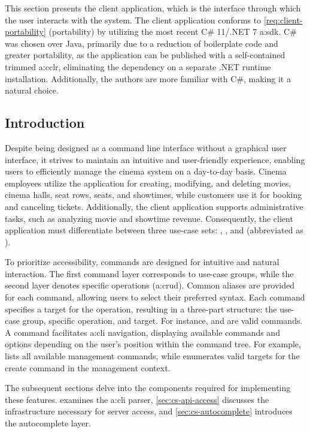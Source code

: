 This section presents the client application, which is the interface through which the user interacts with the system. The client application conforms to \cref{req:client-portability} (portability) by utilizing the most recent C\# 11/.NET 7 \gls{a:sdk}. C\# was chosen over Java, primarily due to a reduction of boilerplate code and greater portability, as the application can be published with a self-contained trimmed \gls{a:cclr}, eliminating the dependency on a separate .NET runtime installation. Additionally, the authors are more familiar with C\#, making it a natural choice.

\subsection{Introduction}

Despite being designed as a command line interface without a graphical user interface, it strives to maintain an intuitive and user-friendly experience, enabling users to efficiently manage the cinema system on a day-to-day basis. Cinema employees utilize the application for creating, modifying, and deleting movies, cinema halls, seat rows, seats, and showtimes, while customers use it for booking and canceling tickets. Additionally, the client application supports administrative tasks, such as analyzing movie and showtime revenue. Consequently, the client application must differentiate between three use-case sets: , , and  (abbreviated as ).

To prioritize accessibility, commands are designed for intuitive and natural interaction. The first command layer corresponds to use-case groups, while the second layer denotes specific operations (\gls{a:crud}). Common aliases are provided for each command, allowing users to select their preferred syntax. Each command specifies a target for the operation, resulting in a three-part structure: the use-case group, specific operation, and target. For instance,  and  are valid commands. A  command facilitates \gls{a:cli} navigation, displaying available commands and options depending on the user's position within the command tree. For example,  lists all available management commands, while  enumerates valid targets for the create command in the management context.

The subsequent sections delve into the components required for implementing these features.  examines the \gls{a:cli} parser, \cref{sec:cs-api-access} discusses the infrastructure necessary for server access, and \cref{sec:cs-autocomplete} introduces the autocomplete layer.

